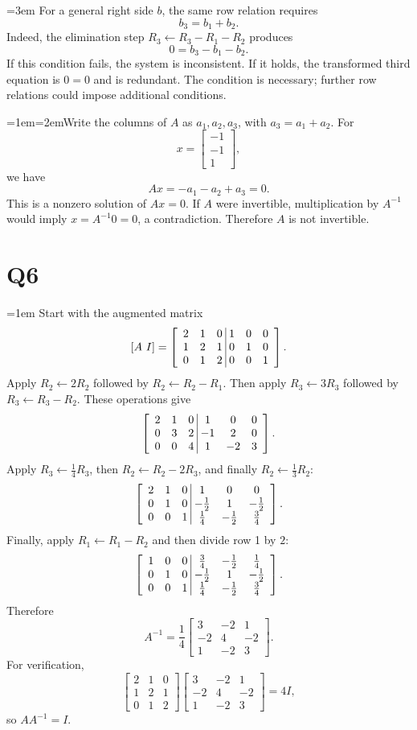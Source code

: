 \documentclass[11pt]{article}
\newcommand{\solutionquestion}[1]{\par\leftskip=0pt\section*{Q#1}\leftskip=1em}
\newcommand{\solutionpart}[1]{\par\smallskip\leftskip=1em\noindent\hangindent=2em\hangafter=1\makebox[1.5em][l]{\textbf{(#1)}}\hspace{0.5em}\ignorespaces}
\newcommand{\solutioncontinuation}{\par\leftskip=3em\noindent\ignorespaces}
\begin{document}
\solutioncontinuation{} For a general right side $b$, the same row relation requires
\[
b_3=b_1+b_2.
\]
Indeed, the elimination step $R_3\leftarrow R_3-R_1-R_2$ produces
\[
0=b_3-b_1-b_2.
\]
If this condition fails, the system is inconsistent. If it holds, the transformed third equation is $0=0$ and is redundant. The condition is necessary; further row relations could impose additional conditions.

\solutionpart{ii}Write the columns of $A$ as $a_1,a_2,a_3$, with $a_3=a_1+a_2$. For
\[
x=\begin{bmatrix}-1\\-1\\1\end{bmatrix},
\]
we have
\[
Ax=-a_1-a_2+a_3=0.
\]
This is a nonzero solution of $Ax=0$. If $A$ were invertible, multiplication by $A^{-1}$ would imply $x=A^{-1}0=0$, a contradiction. Therefore $A$ is not invertible.

\solutionquestion{6}
Start with the augmented matrix
\[
[A\ I]=
\left[
\begin{array}{ccc@{\;\vline\;}ccc}
2&1&0&1&0&0\\
1&2&1&0&1&0\\
0&1&2&0&0&1
\end{array}
\right].
\]
Apply $R_2\leftarrow2R_2$ followed by $R_2\leftarrow R_2-R_1$. Then apply $R_3\leftarrow3R_3$ followed by $R_3\leftarrow R_3-R_2$. These operations give
\[
\left[
\begin{array}{ccc@{\;\vline\;}ccc}
2&1&0&1&0&0\\
0&3&2&-1&2&0\\
0&0&4&1&-2&3
\end{array}
\right].
\]
Apply $R_3\leftarrow\tfrac14R_3$, then $R_2\leftarrow R_2-2R_3$, and finally $R_2\leftarrow\tfrac13R_2$:
\[
\left[
\begin{array}{ccc@{\;\vline\;}ccc}
2&1&0&1&0&0\\
0&1&0&-\tfrac12&1&-\tfrac12\\
0&0&1&\tfrac14&-\tfrac12&\tfrac34
\end{array}
\right].
\]
Finally, apply $R_1\leftarrow R_1-R_2$ and then divide row 1 by $2$:
\[
\left[
\begin{array}{ccc@{\;\vline\;}ccc}
1&0&0&\tfrac34&-\tfrac12&\tfrac14\\
0&1&0&-\tfrac12&1&-\tfrac12\\
0&0&1&\tfrac14&-\tfrac12&\tfrac34
\end{array}
\right].
\]
Therefore
\[
A^{-1}=\frac14
\begin{bmatrix}
3&-2&1\\
-2&4&-2\\
1&-2&3
\end{bmatrix}.
\]
For verification,
\[
\begin{bmatrix}
2&1&0\\
1&2&1\\
0&1&2
\end{bmatrix}
\begin{bmatrix}
3&-2&1\\
-2&4&-2\\
1&-2&3
\end{bmatrix}
=4I,
\]
so $AA^{-1}=I$.
\end{document}
